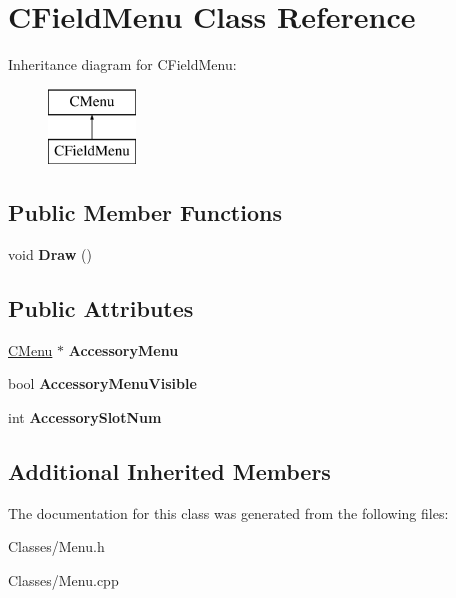 \hypertarget{class_c_field_menu}{}\section{C\+Field\+Menu Class Reference}
\label{class_c_field_menu}
Inheritance diagram for C\+Field\+Menu\+:\begin{figure}[H]
\begin{center}
\leavevmode
\includegraphics[height=2.000000cm]{class_c_field_menu}
\end{center}
\end{figure}
\subsection*{Public Member Functions}
\begin{DoxyCompactItemize}
\item 
void {\bfseries Draw} ()\hypertarget{class_c_field_menu_a5fce4cb692e50a7a0c691646a19c4cb3}{}\label{class_c_field_menu_a5fce4cb692e50a7a0c691646a19c4cb3}

\end{DoxyCompactItemize}
\subsection*{Public Attributes}
\begin{DoxyCompactItemize}
\item 
\hyperlink{class_c_menu}{C\+Menu} $\ast$ {\bfseries Accessory\+Menu}\hypertarget{class_c_field_menu_a70c71460e0ea554f36c8f2462d1c86cc}{}\label{class_c_field_menu_a70c71460e0ea554f36c8f2462d1c86cc}

\item 
bool {\bfseries Accessory\+Menu\+Visible}\hypertarget{class_c_field_menu_a99f77f502d132de4e20ed814ab9cc851}{}\label{class_c_field_menu_a99f77f502d132de4e20ed814ab9cc851}

\item 
int {\bfseries Accessory\+Slot\+Num}\hypertarget{class_c_field_menu_a9897ce6cf79c755a324d3495e8468fa7}{}\label{class_c_field_menu_a9897ce6cf79c755a324d3495e8468fa7}

\end{DoxyCompactItemize}
\subsection*{Additional Inherited Members}


The documentation for this class was generated from the following files\+:\begin{DoxyCompactItemize}
\item 
Classes/Menu.\+h\item 
Classes/Menu.\+cpp\end{DoxyCompactItemize}
